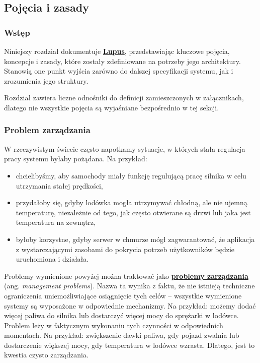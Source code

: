\subsection{Pojęcia i zasady}

\subsubsection{Wstęp}
Niniejszy rozdział dokumentuje \hyperlink{def:lupus}{\textbf{Lupus}}, przedstawiając kluczowe pojęcia, koncepcje i zasady, które zostały zdefiniowane na potrzeby jego architektury. Stanowią one punkt wyjścia zarówno do dalszej specyfikacji systemu, jak i zrozumienia jego struktury.

Rozdział zawiera liczne odnośniki do definicji zamieszczonych w załącznikach, dlatego nie wszystkie pojęcia są wyjaśniane bezpośrednio w tej sekcji.

\subsubsection{Problem zarządzania}

W rzeczywistym świecie często napotkamy sytuacje, w których stała regulacja pracy systemu byłaby pożądana. Na przykład:
\begin{itemize}
    \item chcielibyśmy, aby samochody miały funkcję regulującą pracę silnika w celu utrzymania stałej prędkości,
    \item przydałoby się, gdyby lodówka mogła utrzymywać chłodną, ale nie ujemną temperaturę, niezależnie od tego, jak często otwierane są drzwi lub jaka jest temperatura na zewnątrz,
    \item byłoby korzystne, gdyby serwer w chmurze mógł zagwarantować, że aplikacja z wystarczającymi zasobami do pokrycia potrzeb użytkowników będzie uruchomiona i działała.
\end{itemize}

Problemy wymienione powyżej można traktować jako \hyperlink{def:problem-zarzadzania}{\textbf{problemy zarządzania}} (ang. \textit{management problems}). Nazwa ta wynika z faktu, że nie istnieją techniczne ograniczenia uniemożliwiające osiągnięcie tych celów – wszystkie wymienione systemy są wyposażone w odpowiednie mechanizmy. Na przykład: możemy dodać więcej paliwa do silnika lub dostarczyć więcej mocy do sprężarki w lodówce. Problem leży w faktycznym wykonaniu tych czynności w odpowiednich momentach. Na przykład: zwiększenie dawki paliwa, gdy pojazd zwalnia lub dostarczenie większej mocy, gdy temperatura w lodówce wzrasta. Dlatego, jest to kwestia czysto zarządzania.

